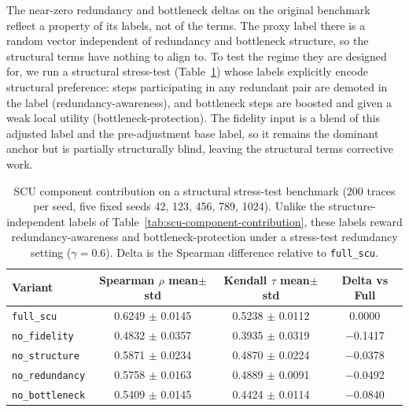 \documentclass[a4paper,fleqn]{cas-sc}
\begin{document}
The near-zero redundancy and bottleneck deltas on the original benchmark reflect a property of its labels, not of the terms. The proxy label there is a random vector independent of redundancy and bottleneck structure, so the structural terms have nothing to align to. To test the regime they are designed for, we run a structural stress-test (Table~\ref{tab:scu-stress-test}) whose labels explicitly encode structural preference: steps participating in any redundant pair are demoted in the label (redundancy-awareness), and bottleneck steps are boosted and given a weak local utility (bottleneck-protection). The fidelity input is a blend of this adjusted label and the pre-adjustment base label, so it remains the dominant anchor but is partially structurally blind, leaving the structural terms corrective work.

\begin{table}[ht]
\caption{SCU component contribution on a structural stress-test benchmark (200 traces per seed, five fixed seeds 42, 123, 456, 789, 1024). Unlike the structure-independent labels of Table~\ref{tab:scu-component-contribution}, these labels reward redundancy-awareness and bottleneck-protection under a stress-test redundancy setting ($\gamma=0.6$). Delta is the Spearman difference relative to \texttt{full\_scu}.}
\label{tab:scu-stress-test}
\centering
\small
\renewcommand{\arraystretch}{1.08}
\begin{tabular}{lccc}
\toprule
\textbf{Variant} & \textbf{Spearman $\rho$ mean$\pm$std} & \textbf{Kendall $\tau$ mean$\pm$std} & \textbf{Delta vs Full} \\
\midrule
\texttt{full\_scu} & 0.6249 $\pm$ 0.0145 & 0.5238 $\pm$ 0.0112 & 0.0000 \\
\texttt{no\_fidelity} & 0.4832 $\pm$ 0.0357 & 0.3935 $\pm$ 0.0319 & $-$0.1417 \\
\texttt{no\_structure} & 0.5871 $\pm$ 0.0234 & 0.4870 $\pm$ 0.0224 & $-$0.0378 \\
\texttt{no\_redundancy} & 0.5758 $\pm$ 0.0163 & 0.4889 $\pm$ 0.0091 & $-$0.0492 \\
\texttt{no\_bottleneck} & 0.5409 $\pm$ 0.0145 & 0.4424 $\pm$ 0.0114 & $-$0.0840 \\
\bottomrule
\end{tabular}
\end{table}
\end{document}
